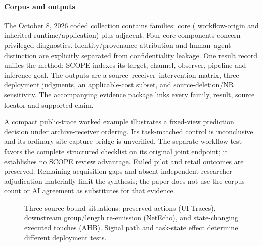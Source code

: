 \paragraph{Corpus and outputs}
The October 8, 2026 coded collection contains \FinalN{} families: \FinalCore{} core (\FinalA{} workflow-origin and \FinalB{} inherited-runtime/application) plus \FinalAdjacent{} adjacent. Four core components concern privileged diagnostics. Identity/provenance attribution and human--agent distinction are explicitly separated from confidentiality leakage. One result record unifies the method; SCOPE indexes its target, channel, observer, pipeline and inference goal. The outputs are a source--receiver--intervention matrix, three deployment judgments, an applicable-cost subset, and source-deletion/NR sensitivity. The accompanying evidence package links every family, result, source locator and supported claim.

A compact public-trace worked example illustrates a fixed-view prediction decision under archive-receiver ordering. Its task-matched control is inconclusive and its ordinary-site capture bridge is unverified. The separate workflow test favors the complete structured checklist on its original joint endpoint; it establishes no SCOPE review advantage. Failed pilot and retail outcomes are preserved. Remaining acquisition gaps and absent independent researcher adjudication materially limit the synthesis; the paper does not use the corpus count or AI agreement as substitutes for that evidence.

\begin{figure}[t]
\centering
\caption{Three source-bound situations: preserved actions (UI Traces), downstream group/length re-emission (NetEcho), and state-changing executed touches (AHB). Signal path and task-state effect determine different deployment tests.}
\label{fig:system-model}
\end{figure}
